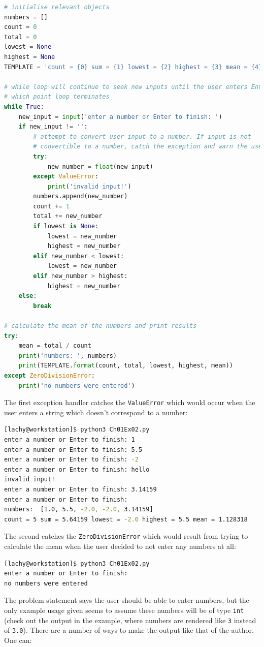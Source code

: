 \documentclass{report}
\begin{document}
\begin{lstlisting}[language=Python, style=pythonStyle]
# initialise relevant objects
numbers = []
count = 0
total = 0
lowest = None
highest = None
TEMPLATE = 'count = {0} sum = {1} lowest = {2} highest = {3} mean = {4}'

# while loop will continue to seek new inputs until the user enters Enter, at 
# which point loop terminates
while True:
    new_input = input('enter a number or Enter to finish: ')
    if new_input != '':
        # attempt to convert user input to a number. If input is not 
        # convertible to a number, catch the exception and warn the user
        try:
            new_number = float(new_input)
        except ValueError:
            print('invalid input!')
        numbers.append(new_number)
        count += 1
        total += new_number
        if lowest is None:
            lowest = new_number
            highest = new_number
        elif new_number < lowest:
            lowest = new_number
        elif new_number > highest:
            highest = new_number
    else:
        break

# calculate the mean of the numbers and print results
try:
    mean = total / count
    print('numbers: ', numbers)
    print(TEMPLATE.format(count, total, lowest, highest, mean))
except ZeroDivisionError:
    print('no numbers were entered')

\end{lstlisting}
The first exception handler catches the \verb|ValueError| which would occur when the user enters a string which doesn't correspond to a number:
\begin{lstlisting}[language=bash, style=terminalStyle]
[lachy@workstation]$ python3 Ch01Ex02.py 
enter a number or Enter to finish: 1
enter a number or Enter to finish: 5.5
enter a number or Enter to finish: -2
enter a number or Enter to finish: hello
invalid input!
enter a number or Enter to finish: 3.14159
enter a number or Enter to finish: 
numbers:  [1.0, 5.5, -2.0, -2.0, 3.14159]
count = 5 sum = 5.64159 lowest = -2.0 highest = 5.5 mean = 1.128318
\end{lstlisting}
The second catches the \verb|ZeroDivisionError| which would result from trying to calculate the mean when the user decided to not enter any numbers at all:
\begin{lstlisting}[language=bash, style=terminalStyle]
[lachy@workstation]$ python3 Ch01Ex02.py 
enter a number or Enter to finish: 
no numbers were entered
\end{lstlisting}
\indent The problem statement says the user should be able to enter numbers, but the only example usage given seems to assume these numbers will be of type \verb|int| (check out the output in the example, where numbers are rendered like \verb|3| instead of \verb|3.0|). There are a number of ways to make the output like that of the author. One can:
\end{document}
